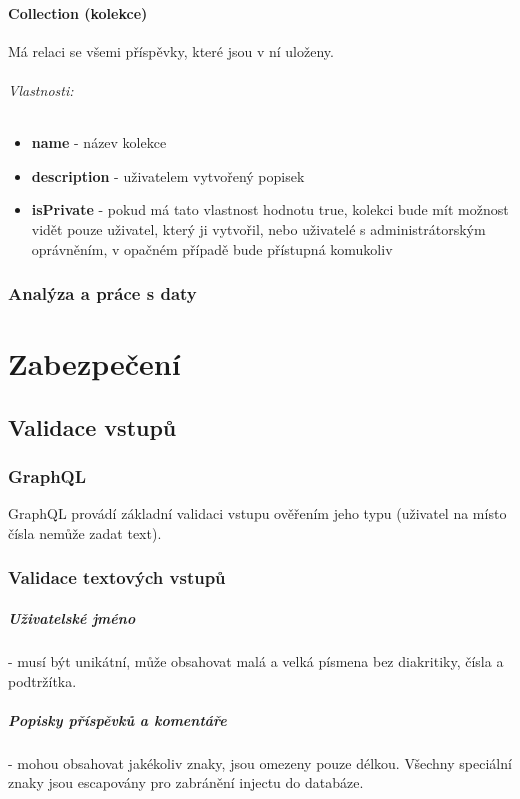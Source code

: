 \documentclass[12pt, a4paper,
 twoside,        %
 openright
]{report}
\newenvironment{propertiesItemize}{
\begin{itemize}{ 
  }}
  {\end{itemize}}
\begin{document}
    	            \subsubsection{Collection (kolekce)} Má relaci  se všemi příspěvky, které jsou v ní uloženy. 
	                        \subparagraph{Vlastnosti:}  
                           \begin{propertiesItemize}
                                \item \textbf{name} - název kolekce
                                \item \textbf{description} - uživatelem vytvořený popisek 
                                \item \textbf{isPrivate} - pokud má tato vlastnost hodnotu true, kolekci bude mít možnost vidět pouze uživatel, který ji vytvořil, nebo uživatelé s administrátorským oprávněním, v opačném případě bude přístupná komukoliv
                        \end{propertiesItemize}
  
        \subsection{Analýza a práce s daty}

\chapter{Zabezpečení}
\section{Validace vstupů}
\subsection{GraphQL}
GraphQL provádí základní validaci vstupu ověřením jeho typu (uživatel na místo čísla nemůže zadat text). 
\subsection{Validace textových vstupů}
\paragraph{Uživatelské jméno}\label{paragraph:username} - musí být unikátní, může obsahovat malá a velká písmena bez diakritiky, čísla a podtržítka.
\paragraph{Popisky příspěvků a komentáře} - mohou obsahovat jakékoliv znaky, jsou omezeny pouze délkou. Všechny speciální znaky jsou escapovány pro zabránění injectu do databáze.
\end{document}
